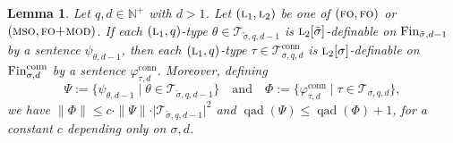 \documentclass[11pt]{article}
\newtheorem{lemma}[theorem]{Lemma}
\renewcommand{\phi}{\varphi}
\newcommand{\fin}{\textup{Fin}}
\newcommand{\conn}{\text{conn}}
\newcommand{\logic}[1]{\textsc{#1}}
\newcommand{\logl}{\logic{l}}
\newcommand{\FO}{\logic{fo}}
\newcommand{\FOmod}{\logic{fo+mod}}
\newcommand{\MSO}{\logic{mso}}
\newcommand{\types}[1][\sigma,q,d]{\mathcal{T}_{#1}}
\newcommand{\ctypes}[1][\sigma,q,d]{\mathcal{T}^{\conn}_{#1}}
\newcommand{\size}[1]{\|#1\|}
\newcommand{\qad}[1]{\operatorname{qad}(#1)}
\newcommand{\st}{\mathbin |}
\newcommand{\absval}[1]{\vert #1 \vert}
\newcommand{\setc}[2]{\{#1 \st #2\}}
\newcommand{\Npos}{\mathbb{N}^{+}}
\begin{document}
\begin{lemma}
  \label{lem:connected-lift}
  Let $q,d \in \Npos$ with $d > 1$. Let $(\logl_1,\logl_2)$ be one of
  $(\FO,\FO)$ or $(\MSO,\FOmod)$. If each $(\logl_1,q)$-type
  $\theta\in\types[\tilde \sigma, q,d-1]$ is
  $\logl_2[\tilde\sigma]$-definable on $\fin_{\tilde\sigma,d-1}$ by a sentence
  $\psi_{\theta,d-1}$, then each $(\logl_1,q)$-type
  $\tau\in\ctypes[\sigma,q,d]$ is $\logl_2[\sigma]$-definable on
  $\fin^{\conn}_{\sigma,d}$ by a sentence $\phi^{\conn}_{\tau,d} $.
  Moreover, defining
  \[
  \Psi:=\setc{\psi_{\theta,d-1}}{\theta\in\types[\tilde \sigma,
    q,d-1]}
  \quad\text{and}\quad
  \Phi:=\setc{\phi^\conn_{\tau,d}}{\tau\in\types[\sigma, q,d]},
  \]
  we have $\size{\Phi} \leq c \cdot \size{\Psi} \cdot
  \absval{\types[\tilde \sigma, q,d-1]}^2$ and $\qad{\Psi} \leq
  \qad{\Phi} + 1$, for a constant $c$ depending only on $\sigma,d$.
\end{lemma}
\end{document}
